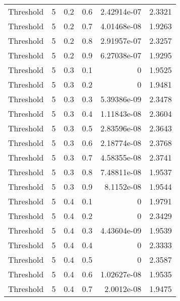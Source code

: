 \documentclass{article}
\begin{document}
\begin{longtable}[H]{lrrrrr}
 Threshold      &       5 &   0.2 &            0.6 &      2.42914e-07 &          2.3321 \\
 Threshold      &       5 &   0.2 &            0.7 &      4.01468e-08 &          1.9263 \\
 Threshold      &       5 &   0.2 &            0.8 &      2.91957e-07 &          2.3257 \\
 Threshold      &       5 &   0.2 &            0.9 &      6.27038e-07 &          1.9295 \\
 Threshold      &       5 &   0.3 &            0.1 &      0           &          1.9525 \\
 Threshold      &       5 &   0.3 &            0.2 &      0           &          1.9481 \\
 Threshold      &       5 &   0.3 &            0.3 &      5.39386e-09 &          2.3478 \\
 Threshold      &       5 &   0.3 &            0.4 &      1.11843e-08 &          2.3604 \\
 Threshold      &       5 &   0.3 &            0.5 &      2.83596e-08 &          2.3643 \\
 Threshold      &       5 &   0.3 &            0.6 &      2.18774e-08 &          2.3768 \\
 Threshold      &       5 &   0.3 &            0.7 &      4.58355e-08 &          2.3741 \\
 Threshold      &       5 &   0.3 &            0.8 &      7.48811e-08 &          1.9537 \\
 Threshold      &       5 &   0.3 &            0.9 &      8.1152e-08  &          1.9544 \\
 Threshold      &       5 &   0.4 &            0.1 &      0           &          1.9791 \\
 Threshold      &       5 &   0.4 &            0.2 &      0           &          2.3429 \\
 Threshold      &       5 &   0.4 &            0.3 &      4.43604e-09 &          1.9539 \\
 Threshold      &       5 &   0.4 &            0.4 &      0           &          2.3333 \\
 Threshold      &       5 &   0.4 &            0.5 &      0           &          2.3587 \\
 Threshold      &       5 &   0.4 &            0.6 &      1.02627e-08 &          1.9535 \\
 Threshold      &       5 &   0.4 &            0.7 &      2.0012e-08  &          1.9475 \\

\end{longtable}
\end{document}
